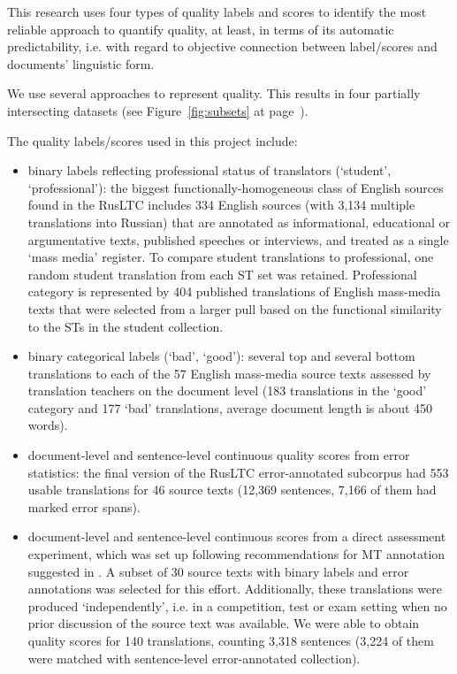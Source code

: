 This research uses four types of quality labels and scores to identify the most reliable approach to quantify quality, at least, in terms of its automatic predictability, i.e. with regard to objective connection between label/scores and documents' linguistic form.

We use several approaches to represent quality. This results in four partially intersecting datasets (see Figure~\ref{fig:subsets} at page~\pageref{pg:subsets}).

The quality labels/scores used in this project include:

\begin{itemize}\compresslist{}
	\item binary labels reflecting professional status of translators (`student', `professional'): the biggest functionally-homogeneous class of English sources found in the \gls*{RusLTC} includes 334 English sources (with 3,134 multiple translations into Russian) that are annotated as informational, educational or argumentative texts, published speeches or interviews, and treated as a single `mass media' register. To compare student translations to professional, one random student translation from each ST set was retained. Professional category is represented by 404 published translations of English mass-media texts that were selected from a larger pull based on the functional similarity to the STs in the student collection.
	\label{pg:binary_qua_labels_corpus}
	\item binary categorical labels (`bad', `good'): several top and several bottom translations to each of the 57 English mass-media source texts assessed by translation teachers on the document level (183 translations in the `good' category and 177 `bad' translations, average document length is about 450 words). 
	
	\item document-level and sentence-level continuous quality scores from error statistics: the final version of the \gls*{RusLTC} error-annotated subcorpus had 553 usable translations for 46 source texts (12,369 sentences, 7,166 of them had marked error spans). 
	
	\item document-level and sentence-level continuous scores from a direct assessment experiment, which was set up following recommendations for \gls*{MT} annotation suggested in \citet{Graham2013, Graham2015, Guzman2019, Laubli2020}. A subset of 30 source texts with binary labels and error annotations was selected for this effort. Additionally, these translations were produced `independently', i.e. in a competition, test or exam setting when no prior discussion of the source text was available. We were able to obtain quality scores for 140 translations, counting 3,318 sentences (3,224 of them were matched with sentence-level error-annotated collection). 
\end{itemize}

